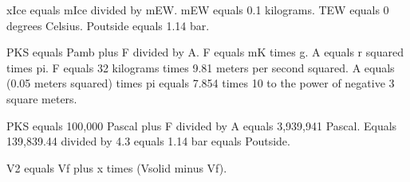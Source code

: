 xIce equals mIce divided by mEW.  
mEW equals 0.1 kilograms.  
TEW equals 0 degrees Celsius.  
Poutside equals 1.14 bar.  

PKS equals Pamb plus F divided by A.  
F equals mK times g.  
A equals r squared times pi.  
F equals 32 kilograms times 9.81 meters per second squared.  
A equals (0.05 meters squared) times pi equals 7.854 times 10 to the power of negative 3 square meters.  

PKS equals 100,000 Pascal plus F divided by A equals 3,939,941 Pascal.  
Equals 139,839.44 divided by 4.3 equals 1.14 bar equals Poutside.  

V2 equals Vf plus x times (Vsolid minus Vf).